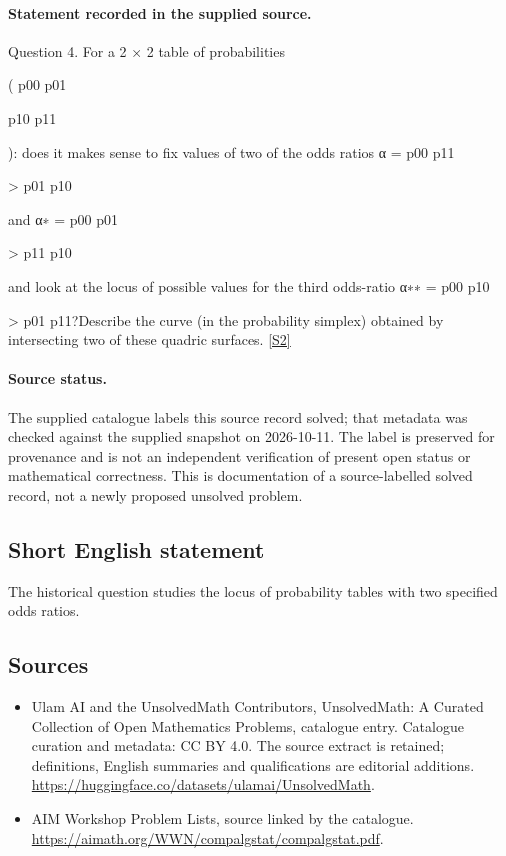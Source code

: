 \documentclass[11pt]{article}
\begin{document}
\paragraph{Statement recorded in the supplied source.}
Question 4. For a 2 × 2 table of probabilities

( p00 p01

p10 p11

): does it makes sense to fix values of two of the odds ratios α = p00 p11

> p01 p10

and α∗ = p00 p01

> p11 p10

and look at the locus of possible values for the third odds-ratio α∗∗ = p00 p10

> p01 p11?Describe the curve (in the probability simplex) obtained by intersecting two of these quadric surfaces. \href{https://aimath.org/WWN/compalgstat/compalgstat.pdf}{[S2]}
\paragraph{Source status.}
The supplied catalogue labels this source record solved; that metadata was checked against the supplied snapshot on 2026-10-11. The label is preserved for provenance and is not an independent verification of present open status or mathematical correctness. This is documentation of a source-labelled solved record, not a newly proposed unsolved problem.
\subsection{Short English statement}
The historical question studies the locus of probability tables with two specified odds ratios.
\subsection{Sources}
\begin{itemize}
\item[S1] Ulam AI and the UnsolvedMath Contributors, UnsolvedMath: A Curated Collection of Open Mathematics Problems, catalogue entry. Catalogue curation and metadata: CC BY 4.0. The source extract is retained; definitions, English summaries and qualifications are editorial additions.
\url{https://huggingface.co/datasets/ulamai/UnsolvedMath}.
\item[S2] AIM Workshop Problem Lists, source linked by the catalogue.
\url{https://aimath.org/WWN/compalgstat/compalgstat.pdf}.
\end{itemize}
\end{document}
